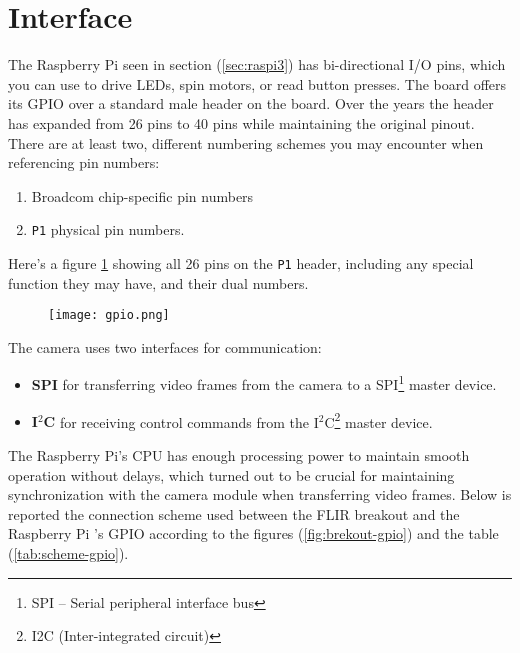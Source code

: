 %
\section{Interface}
\label{sec:lepton-interface}
The Raspberry Pi seen in section (\ref{sec:raspi3}) has bi-directional I/O pins, which you can use to drive LEDs, spin motors, or read button presses.
The board offers its GPIO over a standard male header on the board. Over the years the header has expanded from 26 pins to 40 pins while maintaining the original pinout.
There are at least two, different numbering schemes you may encounter when referencing pin numbers:
\begin{enumerate}
\item Broadcom chip-specific pin numbers 
\item \texttt{P1} physical pin numbers.
\end{enumerate} 
Here's a figure \ref{fig:gpio} showing all 26 pins on the \texttt{P1} header, including any special function they may have, and their dual numbers.
%
%
\begin{figure}[htb]
	\centering
	\texttt{[image: gpio.png]}
	\label{fig:gpio}
\end{figure}
%
\newline The camera uses two interfaces for communication:
\begin{itemize}
\item \textbf{SPI} for transferring video frames from the camera to a SPI\footnote{SPI – Serial peripheral interface bus} master device.
\item \textbf{I$^2$C} for receiving control commands from the I$^2$C\footnote{I2C (Inter-integrated circuit)} master device.
\end{itemize}
The Raspberry Pi's CPU  has enough processing power to maintain smooth operation without delays, which turned out to be crucial for maintaining synchronization with the camera module when transferring video frames.
Below is reported the connection scheme used between the
FLIR breakout and the Raspberry Pi 's GPIO according to the figures (\ref{fig:brekout-gpio}) and the table (\ref{tab:scheme-gpio}).  

